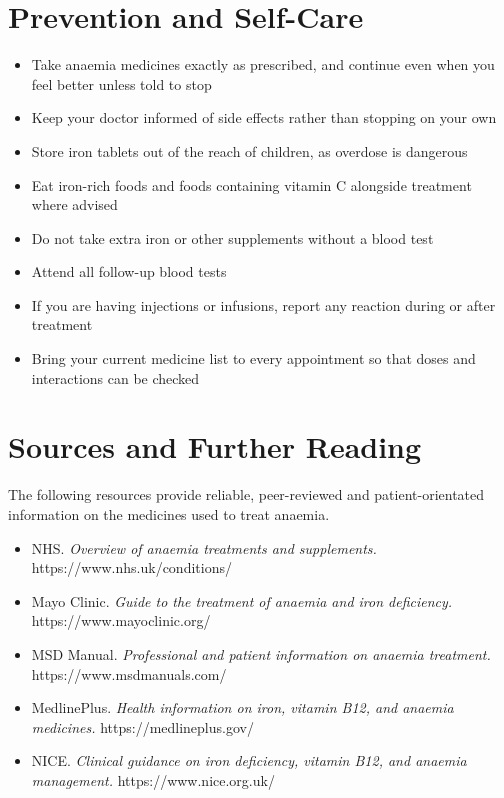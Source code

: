 \section*{Prevention and Self-Care}
\begin{itemize}
    \item Take anaemia medicines exactly as prescribed, and continue even when you feel better unless told to stop
    \item Keep your doctor informed of side effects rather than stopping on your own
    \item Store iron tablets out of the reach of children, as overdose is dangerous
    \item Eat iron-rich foods and foods containing vitamin C alongside treatment where advised
    \item Do not take extra iron or other supplements without a blood test
    \item Attend all follow-up blood tests
    \item If you are having injections or infusions, report any reaction during or after treatment
    \item Bring your current medicine list to every appointment so that doses and interactions can be checked
\end{itemize}

\section*{Sources and Further Reading}
The following resources provide reliable, peer-reviewed and patient-orientated information on the medicines used to treat anaemia.

\begin{itemize}
    \item NHS. \textit{Overview of anaemia treatments and supplements.} https://www.nhs.uk/conditions/
    \item Mayo Clinic. \textit{Guide to the treatment of anaemia and iron deficiency.} https://www.mayoclinic.org/
    \item MSD Manual. \textit{Professional and patient information on anaemia treatment.} https://www.msdmanuals.com/
    \item MedlinePlus. \textit{Health information on iron, vitamin B12, and anaemia medicines.} https://medlineplus.gov/
    \item NICE. \textit{Clinical guidance on iron deficiency, vitamin B12, and anaemia management.} https://www.nice.org.uk/
\end{itemize}
